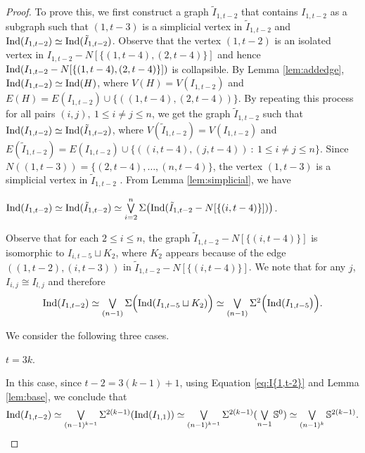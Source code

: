 \documentclass[12pt]{article}
\numberwithin{thm}{section}
\theoremstyle{definition}
\newcommand{\bS}{\mathbb{S}}
\newcommand{\ind}{{\rm{Ind}}}
\begin{document}
\begin{proof}
	To prove this, we first construct a graph $\tilde{I}_{1,t-2}$ that contains $I_{1,t-2}$ as a subgraph such that $(1,t-3)$ is  a simplicial vertex in $\tilde{I}_{1,t-2}$ and $\ind(I_{1,t-2}) \simeq \ind(\tilde{I}_{1,t-2})$. Observe that the vertex $(1,t-2)$ is an isolated vertex in $I_{1, t-2} - N[\{(1,t-4), (2,t-4)\}]$ and hence $\ind(I_{1,t-2} - N[\{(1,t-4),(2,t-4)\}])$ is collapsible. By Lemma \ref{lem:addedge}, $\ind(I_{1,t-2}) \simeq \ind(H)$, where $V(H) = V(I_{1, t-2})$ and $E(H) = E(I_{1, t-2}) \cup \{((1,t-4), (2,t-4))\}$. By repeating this process for all pairs $(i, j),\  1 \leq i \neq j \leq n$, we get the graph $\tilde{I}_{1,t-2}$ such that $\ind(I_{1,t-2}) \simeq \ind(\tilde{I}_{1,t-2})$, where $V(\tilde{I}_{1,t-2}) = V(I_{1,t-2})$ and $E(\tilde{I}_{1,t-2}) =E(I_{1,t-2}) \cup \{((i,t-4), (j,t-4))\ : \  1 \leq i \neq  j \leq n\}$. Since $N((1,t-3)) = \{(2,t-4), \ldots, (n,t-4)\}$, the vertex $(1,t-3)$ is a simplicial vertex in $\tilde{I}_{1,t-2}$ .  From Lemma \ref{lem:simplicial}, we have 
	\begin{center}
	$\ind(I_{1,t-2}) \simeq \ind(\tilde{I}_{1,t-2}) \simeq \bigvee\limits_{i= 2}^{n} \Sigma \big{(}\ind(\tilde{I}_{1,t-2} - N[	\{(i,t-4)\}])\big{)}$.
	\end{center}
	

Observe that for each $2 \leq i \leq n$,  the graph $\tilde{I}_{1,t-2} - N[	\{(i,t-4)\}]$ is isomorphic to $I_{i, t-5} \sqcup K_2$, where $K_2$ appears because of the edge $((1, t-2), (i, t-3))$ in $\tilde{I}_{1,t-2}- N[\{(i,t-4)\}]$. We note that for any $j$,  $I_{i, j} \cong I_{l, j}$  and therefore 
	\begin{align}\label{eq:I{1,t-2}}
	\textstyle \ind(I_{1,t-2})
	\simeq \bigvee\limits_{(n-1)} \Sigma \Big( \ind(I_{1, t-5} \sqcup K_2)\Big) \simeq \bigvee\limits_{(n-1)} \Sigma^2 \Big( \ind(I_{1, t-5}\big)\Big).
	\end{align}

We consider the following three cases.

 $t = 3k$.

In this case, since $t-2= 3(k-1)+1$, using  Equation \eqref{eq:I{1,t-2}} and Lemma \ref{lem:base}, we conclude that 
\begin{align*}
\textstyle \ind(I_{1,t-2}) \simeq \bigvee\limits_{(n-1)^{k-1}} \Sigma^{2(k-1)} (\ind(I_{1,1}) )\simeq \bigvee\limits_{(n-1)^{k-1}} \Sigma^{2(k-1)} (\bigvee\limits_{n-1} \bS^{0}) \simeq \bigvee\limits_{(n-1)^{k}} \bS^{2(k-1)}.
\end{align*}


\end{proof}
\end{document}
